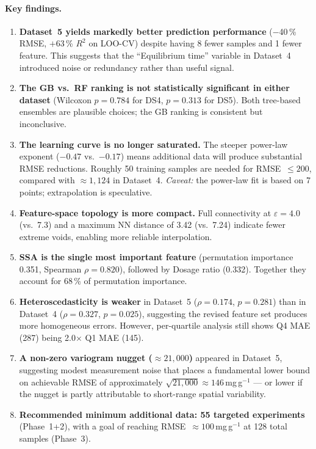 \documentclass[12pt,a4paper]{article}
\begin{document}
\paragraph{Key findings.}
\begin{enumerate}[leftmargin=*]
  \item \textbf{Dataset~5 yields markedly better prediction performance}
        ($-$40\,\% RMSE, $+$63\,\% $R^2$ on LOO-CV) despite having
        8 fewer samples and 1 fewer feature.  This suggests that the
        ``Equilibrium time'' variable in Dataset~4 introduced noise
        or redundancy rather than useful signal.

  \item \textbf{The GB vs.\ RF ranking is not statistically significant
        in either dataset} (Wilcoxon $p = 0.784$ for DS4, $p = 0.313$
        for DS5).  Both tree-based ensembles are plausible choices; the
        GB ranking is consistent but inconclusive.

  \item \textbf{The learning curve is no longer saturated.}  The steeper
        power-law exponent ($-0.47$ vs.\ $-0.17$) means additional data
        will produce substantial RMSE reductions.  Roughly 50 training
        samples are needed for RMSE~$\leq 200$, compared with
        $\approx 1{,}124$ in Dataset~4.  \emph{Caveat:} the power-law
        fit is based on 7 points; extrapolation is speculative.

  \item \textbf{Feature-space topology is more compact.}  Full connectivity
        at $\varepsilon = 4.0$ (vs.\ 7.3) and a maximum NN distance of
        3.42 (vs.\ 7.24) indicate fewer extreme voids, enabling more
        reliable interpolation.

  \item \textbf{SSA is the single most important feature} (permutation
        importance 0.351, Spearman $\rho = 0.820$), followed by Dosage
        ratio (0.332).  Together they account for 68\,\% of permutation
        importance.

  \item \textbf{Heteroscedasticity is weaker} in Dataset~5
        ($\rho = 0.174$, $p = 0.281$) than in Dataset~4
        ($\rho = 0.327$, $p = 0.025$), suggesting the revised feature
        set produces more homogeneous errors.  However, per-quartile
        analysis still shows Q4 MAE (287) being 2.0$\times$ Q1 MAE (145).

  \item \textbf{A non-zero variogram nugget ($\approx 21{,}000$)} appeared
        in Dataset~5, suggesting modest measurement noise that places
        a fundamental lower bound on achievable RMSE of approximately
        $\sqrt{21{,}000} \approx 146$\,mg\,g$^{-1}$ — or lower if the
        nugget is partly attributable to short-range spatial variability.

  \item \textbf{Recommended minimum additional data: 55 targeted experiments}
        (Phase~1+2), with a goal of reaching RMSE~$\approx 100$\,mg\,g$^{-1}$
        at 128 total samples (Phase~3).
\end{enumerate}
\end{document}
